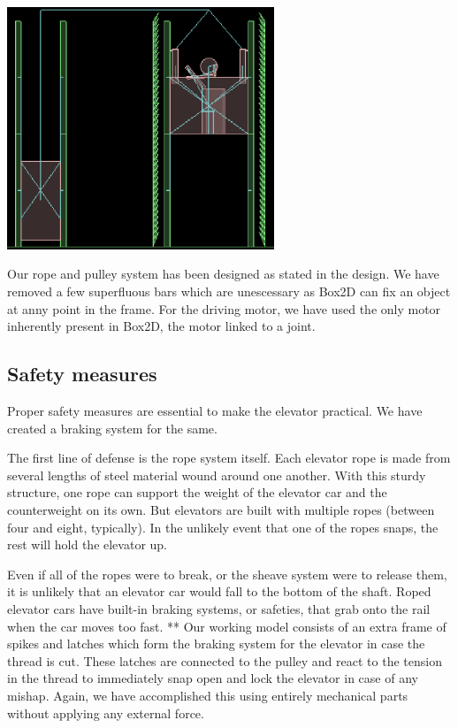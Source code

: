 \documentclass[a4paper,11pt]{article}
\begin{document}
\begin{center}
\includegraphics[width=0.6\textwidth]{images/elevator.eps} 
\end{center}

Our rope and pulley system has been designed as stated in the design. We have removed a few superfluous bars which are unescessary as Box2D can fix an object at anny point in the frame. For the driving motor, we have used the only motor inherently present in Box2D, the motor linked to a joint.

\subsection{Safety measures}

Proper safety measures are essential to make the elevator practical. We have created a braking system for the same.

The first line of defense is the rope system itself. Each elevator rope is made from several lengths of steel material wound around one another. With this sturdy structure, one rope can support the weight of the elevator car and the counterweight on its own. But elevators are built with multiple ropes (between four and eight, typically). In the unlikely event that one of the ropes snaps, the rest will hold the elevator up.

Even if all of the ropes were to break, or the sheave system were to release them, it is unlikely that an elevator car would fall to the bottom of the shaft. Roped elevator cars have built-in braking systems, or safeties, that grab onto the rail when the car moves too fast.
** Our working model consists of an extra frame of spikes and latches which form the braking system for the elevator in case the thread is cut. These latches are connected to the pulley and react to the tension in the thread to immediately snap open and lock the elevator in case of any mishap. Again, we have accomplished this using entirely mechanical parts without applying any external force.
\end{document}
